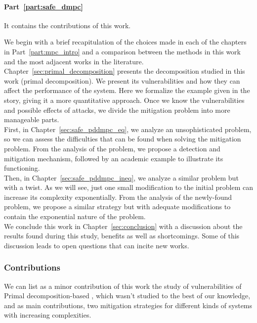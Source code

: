 \documentclass[../main.tex]{subfiles}
\begin{document}
\paragraph{Part~\ref{part:safe_dmpc}} It contains the contributions of this work.

We begin with a brief recapitulation of the choices made in each of the chapters in Part~\ref{part:mpc_intro} and a comparison between the methods in this work and the most adjacent works in the literature.
\\Chapter~\ref{sec:primal_decomposition} presents the decomposition studied in this work (primal decomposition). We present its vulnerabilities and how they can affect the performance of the system. Here we formalize the example given in the story, giving it a more quantitative approach.
Once we know the vulnerabilities and possible effects of attacks, we divide the mitigation problem into more manageable parts.
\\ First, in Chapter~\ref{sec:safe_pddmpc_eq}, we analyze an unsophisticated problem, so we can assess the difficulties that can be found when solving the mitigation problem. From the analysis of the problem, we propose a detection and mitigation mechanism, followed by an academic example to illustrate its functioning.
\\Then, in Chapter~\ref{sec:safe_pddmpc_ineq}, we analyze a similar problem but with a twist. As we will see, just one small modification to the initial problem can increase its complexity exponentially.
From the analysis of the newly-found problem, we propose a similar strategy but with adequate modifications to contain the exponential nature of the problem.
\\We conclude this work in Chapter~\ref{sec:conclusion} with a discussion about the results found during this study, benefits as well as shortcomings. Some of this discussion leads to open questions that can incite new works.

\subsubsection{Contributions}
We can list as a minor contribution of this work the study of vulnerabilities of Primal decomposition-based \dmpc{}, which wasn't studied to the best of our knowledge,
and as main contributions, two mitigation strategies for different kinds of systems with increasing complexities.
\end{document}
